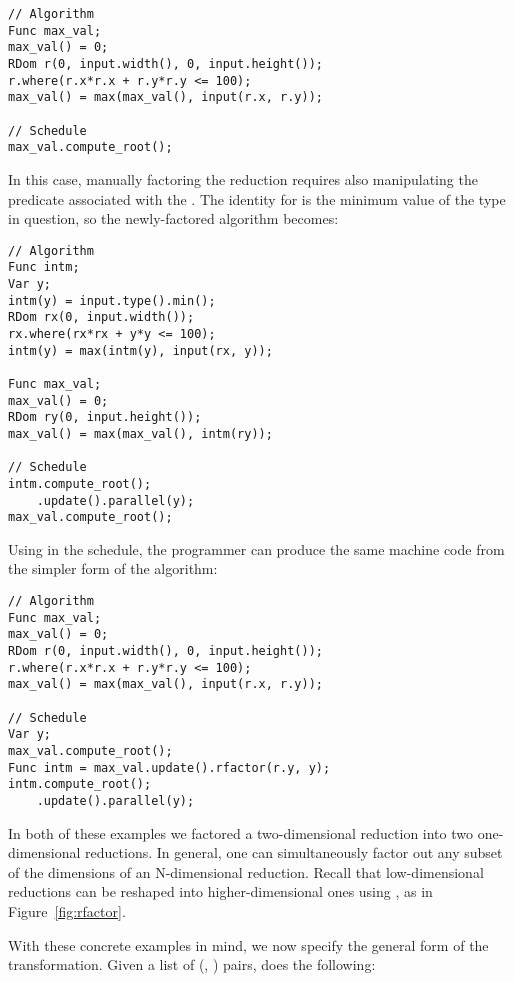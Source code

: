 \begin{lstlisting}
// Algorithm
Func max_val;
max_val() = 0;
RDom r(0, input.width(), 0, input.height());
r.where(r.x*r.x + r.y*r.y <= 100);
max_val() = max(max_val(), input(r.x, r.y));

// Schedule
max_val.compute_root();
\end{lstlisting}

In this case, manually factoring the reduction requires also manipulating the predicate associated with the . The identity for  is the minimum value of the type in question, so the newly-factored algorithm becomes:

\begin{lstlisting}
// Algorithm
Func intm;
Var y;
intm(y) = input.type().min();
RDom rx(0, input.width());
rx.where(rx*rx + y*y <= 100);
intm(y) = max(intm(y), input(rx, y));

Func max_val;
max_val() = 0;
RDom ry(0, input.height());
max_val() = max(max_val(), intm(ry));

// Schedule
intm.compute_root();
    .update().parallel(y);
max_val.compute_root();
\end{lstlisting}

Using  in the schedule, the programmer can produce the same machine code from the simpler form of the algorithm:

\begin{minipage}{\linewidth}
\begin{lstlisting}
// Algorithm
Func max_val;
max_val() = 0;
RDom r(0, input.width(), 0, input.height());
r.where(r.x*r.x + r.y*r.y <= 100);
max_val() = max(max_val(), input(r.x, r.y));

// Schedule
Var y;
max_val.compute_root();
Func intm = max_val.update().rfactor(r.y, y);
intm.compute_root();
    .update().parallel(y);
\end{lstlisting}
\end{minipage}

In both of these examples we factored a two-dimensional reduction into two one-dimensional reductions. In general, one can simultaneously factor out any subset of the dimensions of an N-dimensional reduction. Recall that low-dimensional reductions can be reshaped into higher-dimensional ones using , as in Figure~\ref{fig:rfactor}.

With these concrete examples in mind, we now specify the general form of the transformation. Given a list of (, ) pairs,  does the following:

